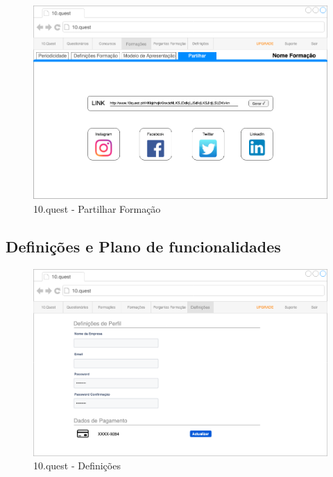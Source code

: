 \begin{figure}[ht!]
	\begin{center}
		\includegraphics[width=1\textwidth]{img/prototipos/12.png}
		\caption{10.quest - Partilhar Formação}
		\label{10q-}
	\end{center}
\end{figure}


\newpage

\subsection{Definições e Plano de funcionalidades}


\begin{figure}[ht!]
	\begin{center}
		\includegraphics[width=1\textwidth]{img/prototipos/20.png}
		\caption{10.quest - Definições}
		\label{10q-}
	\end{center}
\end{figure}

